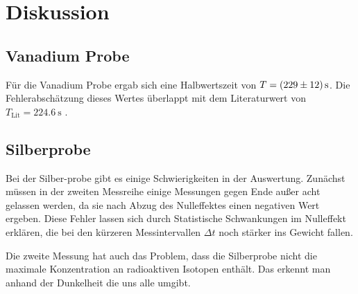 \section{Diskussion}
\subsection{Vanadium Probe}
Für die Vanadium Probe ergab sich eine Halbwertszeit von $T = \qty{229 \pm 12}{\s}$.
Die Fehlerabschätzung dieses Wertes überlappt mit dem Literaturwert von $T_\text{Lit} = \qty{224.6}{\s}$ \cite{periodensystem}. 

\subsection{Silberprobe}
Bei der Silber-probe gibt es einige Schwierigkeiten in der Auswertung.
Zunächst müssen in der zweiten Messreihe einige Messungen gegen Ende außer acht gelassen werden, da 
sie nach Abzug des Nulleffektes einen negativen Wert ergeben.
Diese Fehler lassen sich durch Statistische Schwankungen im Nulleffekt erklären, 
die bei den kürzeren Messintervallen $\Delta t$ noch stärker ins Gewicht fallen.

Die zweite Messung hat auch das Problem, dass die Silberprobe nicht die maximale Konzentration
an radioaktiven Isotopen enthält.
Das erkennt man anhand der Dunkelheit die uns alle umgibt. 

